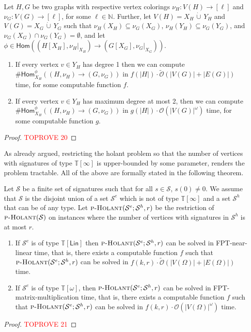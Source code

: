 \documentclass[authorcolumns,numberwithinsect]{no-lipics-v2022}
\newcommand{\homs}[2]{\mathsf{Hom}(#1 \to #2)}
\newcommand{\parthomsX}[3]{\mathsf{Hom}^{\phi}_{#3}(#1 \to #2)}
\newcommand{\holantprob}{\text{\sc{p-Holant}}}
\begin{document}
\begin{lemma}\label{lem:partialHomsFPT}
Let $H, G$ be two graphs with respective vertex colorings $\nu_H: V(H) \to [\ell]$ and $\nu_G : V(G) \to [\ell]$, for some $\ell \in \mathbb{N}$. Further, let $V(H) = X_H \,\dot\cup\, Y_H$ and $V(G) = X_G \,\dot\cup\, Y_G$ such that $\nu_H(X_H) \subseteq \nu_G(X_G)$, $\nu_H(Y_H) \subseteq \nu_G(Y_G)$, and $\nu_G(X_G)\cap\nu_G(Y_G) = \emptyset$, and let $\phi \in \homs{(H[X_H], \nu_H|_{X_H})}{(G[X_G], \nu_G|_{X_G})}$.
\begin{enumerate}
    \item If every vertex $v \in Y_H$ has degree 1 then we can compute $\#\parthomsX{(H, \nu_H)}{(G, \nu_G)}{X_H}$ in $f(|H|)\cdot\tilde{\mathcal{O}}(|V(G)| + |E(G)|)$ time, for some computable function $f$.
    \item If every vertex $v \in Y_H$ has maximum degree at most 2, then we can compute $\#\parthomsX{(H, \nu_H)}{(G, \nu_G)}{X_H}$ in $g(|H|)\cdot\mathcal{O}(|V(G)|^{\omega})$ time, for some computable function $g$.
\end{enumerate}
\end{lemma}
\begin{proof}\textcolor{red}{TOPROVE 20}\end{proof}

As already argued, restricting the holant problem so that the number of vertices with signatures of type $\mathbb{T}[\infty]$ is upper-bounded by some parameter, renders the problem tractable. All of the above are formally stated in the following theorem.

\begin{lemma}\label{lem:restrictedHolant}
Let $\mathcal{S}$ be a finite set of signatures such that for all $s \in \mathcal{S}$, $s(0) \neq 0$. We assume that $\mathcal{S}$ is the disjoint union of a set $\mathcal{S}^e$ which is not of type $\mathbb{T}[\infty]$ and a set $\mathcal{S}^h$ that can be of any type. Let $\holantprob(\mathcal{S}^e;\mathcal{S}^h, r)$ be the restriction of $\holantprob(\mathcal{S})$ on instances where the number of vertices with signatures in $\mathcal{S}^h$ is at most $r$. 
\begin{enumerate} 
\item If $\mathcal{S}^e$ is of type $\mathbb{T}[\mathsf{Lin}]$ then $\holantprob(\mathcal{S}^e;\mathcal{S}^h, r)$ can be solved in FPT-near-linear time, that is, there exists a computable function $f$ such that $\holantprob(\mathcal{S}^e;\mathcal{S}^h,r)$ can be solved in $f(k,r)\cdot\tilde{\mathcal{O}}(|V(\Omega)| + |E(\Omega)|)$ time. 
\item If $\mathcal{S}^e$ is of type $\mathbb{T}[\omega]$, then $\holantprob(\mathcal{S}^e; \mathcal{S}^h, r)$ can be solved in FPT-matrix-multiplication time, that is, there exists a computable function $f$ such that $\holantprob(\mathcal{S}^e;\mathcal{S}^h,r)$ can be solved in $f(k, r)\cdot\mathcal{O}(|V(\Omega)|^{\omega})$ time.
\end{enumerate}
\end{lemma}
\begin{proof}\textcolor{red}{TOPROVE 21}\end{proof}
\end{document}

